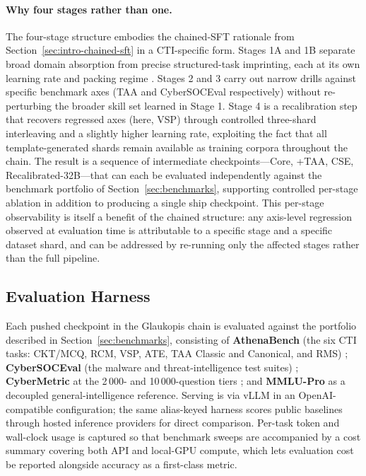 \documentclass[unnumsec,webpdf,contemporary,large]{oup-authoring-template}
\theoremstyle{thmstyleone}
\theoremstyle{thmstyletwo}
\theoremstyle{thmstylethree}
\begin{document}
\paragraph{Why four stages rather than one.}
The four-stage structure embodies the chained-SFT rationale from Section~\ref{sec:intro-chained-sft} in a CTI-specific form. Stages 1A and 1B separate broad domain absorption from precise structured-task imprinting, each at its own learning rate and packing regime \cite{gururangan2020dontstop,chung2022flant5}. Stages 2 and 3 carry out narrow drills against specific benchmark axes (TAA and CyberSOCEval respectively) without re-perturbing the broader skill set learned in Stage 1. Stage 4 is a recalibration step that recovers regressed axes (here, VSP) through controlled three-shard interleaving and a slightly higher learning rate, exploiting the fact that all template-generated shards remain available as training corpora throughout the chain. The result is a sequence of intermediate checkpoints---Core, +TAA, CSE, Recalibrated-32B---that can each be evaluated independently against the benchmark portfolio of Section~\ref{sec:benchmarks}, supporting controlled per-stage ablation in addition to producing a single ship checkpoint. This per-stage observability is itself a benefit of the chained structure: any axis-level regression observed at evaluation time is attributable to a specific stage and a specific dataset shard, and can be addressed by re-running only the affected stages rather than the full pipeline.

\subsection{Evaluation Harness}
\label{sec:glaukopis-eval}

Each pushed checkpoint in the Glaukopis chain is evaluated against the portfolio described in Section~\ref{sec:benchmarks}, consisting of \textbf{AthenaBench} (the six CTI tasks: CKT/MCQ, RCM, VSP, ATE, TAA Classic and Canonical, and RMS) \cite{alam2025athenabench}; \textbf{CyberSOCEval} (the malware and threat-intelligence test suites) \cite{cybersoceval2025}; \textbf{CyberMetric} at the 2\,000- and 10\,000-question tiers \cite{tihanyi2024cybermetric}; and \textbf{MMLU-Pro} as a decoupled general-intelligence reference. Serving is via vLLM in an OpenAI-compatible configuration; the same alias-keyed harness scores public baselines through hosted inference providers for direct comparison. Per-task token and wall-clock usage is captured so that benchmark sweeps are accompanied by a cost summary covering both API and local-GPU compute, which lets evaluation cost be reported alongside accuracy as a first-class metric.
\end{document}
